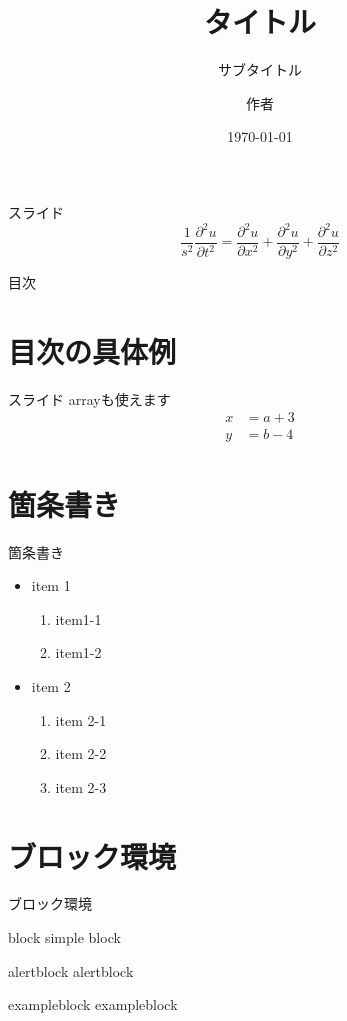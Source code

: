 \documentclass[lualatex,aspectratio=169,unicode, 12pt]{beamer}
\title{タイトル}
\subtitle{サブタイトル}
\author[著者略称]{作者}
\institute[所属略称]{所属}
\date{\today}
\begin{document}
\frame{\maketitle}

\begin{frame}{スライド}
 \begin{equation}
  \frac{1}{s^{2}}\frac{\partial^{2} u}{\partial t^{2}} = \frac{\partial^{2} u}{\partial x^{2}} + \frac{\partial^{2} u}{\partial y^{2}} + \frac{\partial^{2} u}{\partial z^{2}}
 \end{equation}
\end{frame}

\begin{frame}[plain]{目次}
 \tableofcontents
\end{frame}

\section{目次の具体例}
\begin{frame}[plain]{スライド}
 arrayも使えます
 \begin{align}
  x &= a + 3 \\
  y &= b - 4
 \end{align}
\end{frame}

\section{箇条書き}
\begin{frame}[plain]{箇条書き}
 \begin{itemize}
  \item item 1
        \begin{enumerate}
         \item item1-1
         \item item1-2
        \end{enumerate}
  \item item 2
        \begin{enumerate}[I]
         \item item 2-1
         \item item 2-2
         \item item 2-3
        \end{enumerate}
 \end{itemize}
\end{frame}

\section{ブロック環境}
\begin{frame}[plain]{ブロック環境}
 \begin{block}{block}
  simple block
 \end{block}
 \begin{alertblock}{alertblock}
  alertblock
 \end{alertblock}
 \begin{exampleblock}{exampleblock}
  exampleblock
 \end{exampleblock}
\end{frame}
\end{document}
